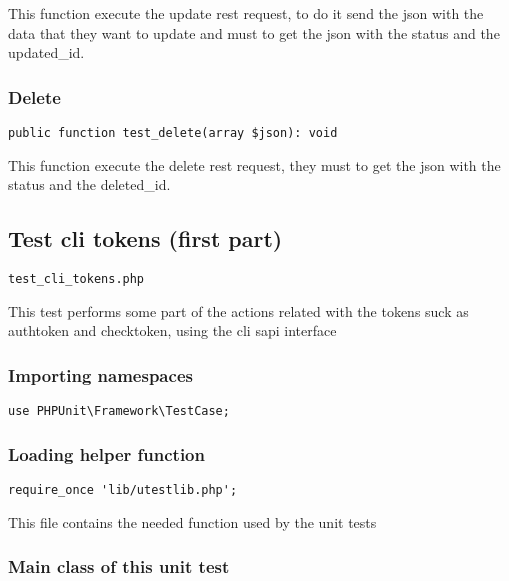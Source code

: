 \documentclass[a4paper]{article}
\begin{document}
This function execute the update rest request, to do it send the json with
the data that they want to update and must to get the json with the status
and the updated\_id.

\hypertarget{toc74}{}
\subsubsection{Delete}

\begin{lstlisting}
public function test_delete(array $json): void
\end{lstlisting}

This function execute the delete rest request, they must to get the json
with the status and the deleted\_id.

\hypertarget{toc75}{}
\subsection{Test cli tokens (first part)}

\begin{lstlisting}
test_cli_tokens.php
\end{lstlisting}

This test performs some part of the actions related with the tokens suck
as authtoken and checktoken, using the cli sapi interface

\hypertarget{toc76}{}
\subsubsection{Importing namespaces}

\begin{lstlisting}
use PHPUnit\Framework\TestCase;
\end{lstlisting}

\hypertarget{toc77}{}
\subsubsection{Loading helper function}

\begin{lstlisting}
require_once 'lib/utestlib.php';
\end{lstlisting}

This file contains the needed function used by the unit tests

\hypertarget{toc78}{}
\subsubsection{Main class of this unit test}
\end{document}
